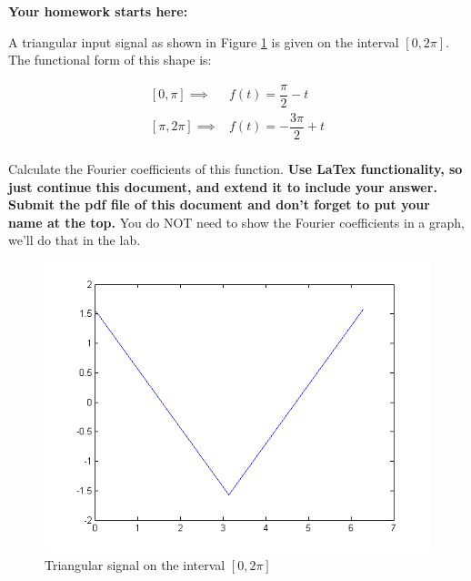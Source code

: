 \documentclass[11pt,letterpaper]{article}
\begin{document}
\cleardoublepage

\begin{center}
\textbf{Your homework starts here:}
\end{center}

A triangular input signal as shown in Figure \ref{fig:HW_FourierSeries7} is given on the interval $[0, 2 \pi]$. The functional form of this shape is:

\begin{equation} \label{Eqn:HW_FourierSeries14}
\begin{split}
[0,  \pi] \implies &f(t) = \dfrac{\pi}{2} -t\\
[\pi, 2 \pi ] \implies &f(t) = - \dfrac{3 \pi}{2} + t\\ 
\end{split}
\end{equation}
 
Calculate the Fourier coefficients of this function. 
\textbf{Use LaTex functionality, so just continue this document, and extend it to include your answer. Submit the pdf file of this document and don't forget to put your name at the top.} You do NOT need to show the Fourier coefficients in a graph, we'll do that in the lab.

\begin{figure}
\centering
\includegraphics[width=0.7\linewidth]{HW_FourierSeries7}
\caption{Triangular signal on the interval $[0, 2 \pi]$}
\label{fig:HW_FourierSeries7}
\end{figure}
\end{document}
